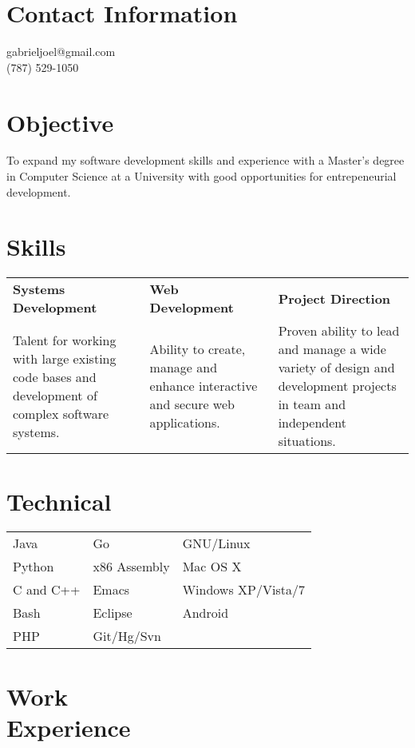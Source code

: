 \documentclass[margin,line]{res}
\begin{document}


\begin{resume}
\section{\sc Contact Information}
\vspace{.05in}
gabrieljoel@gmail.com \\
(787) 529-1050       



\section{\sc Objective}
To expand my software development skills and experience with a Master's degree in Computer Science at a University with good opportunities for entrepeneurial development.  
\section{\sc Skills}
\begin{tabular}{@{}p{2in}p{2in}p{1.7in}}
{\bf Systems Development}             & {\bf Web Development}  & {\bf Project Direction} \\            
Talent for working with large existing code bases and development of complex software systems. & Ability to create, manage and enhance interactive and secure web applications. & Proven ability to lead and manage a wide variety of design and development projects in team and independent situations.   
\end{tabular}

\section{\sc Technical}
\begin{tabular}{@{}p{2in}p{2in}p{2in}}
 Java           & Go  & GNU/Linux  \\            
Python   & x86 Assembly & Mac OS X   \\
C and C++ & Emacs & Windows XP/Vista/7 \\
Bash & Eclipse & Android \\
PHP & Git/Hg/Svn  & 
\end{tabular}



\section{\sc Work \\Experience}


\end{resume}
\end{document}
